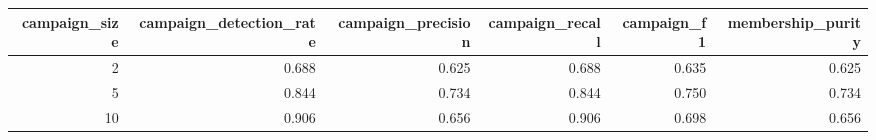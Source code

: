\begin{tabular}{rrrrrr}
\toprule
campaign_size & campaign_detection_rate & campaign_precision & campaign_recall & campaign_f1 & membership_purity \\
\midrule
2 & 0.688 & 0.625 & 0.688 & 0.635 & 0.625 \\
5 & 0.844 & 0.734 & 0.844 & 0.750 & 0.734 \\
10 & 0.906 & 0.656 & 0.906 & 0.698 & 0.656 \\
\bottomrule
\end{tabular}

